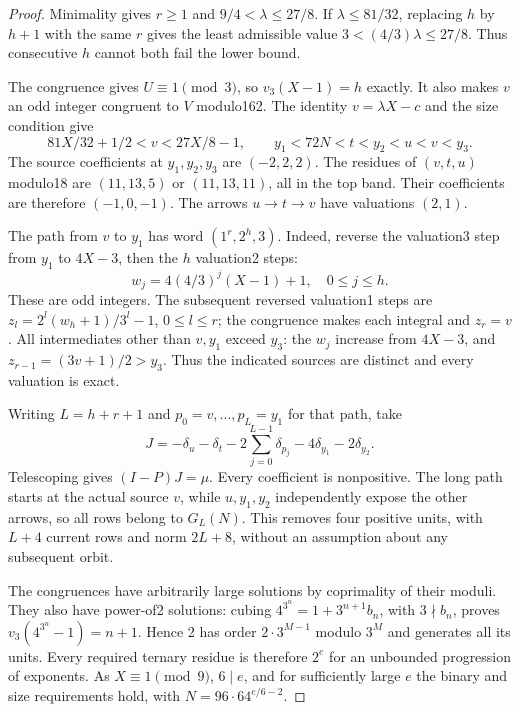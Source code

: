 \documentclass[11pt]{article}
\begin{document}
\begin{proof}
Minimality gives $r\ge1$ and $9/4<\lambda\le27/8$. If
$\lambda\le81/32$, replacing $h$ by $h+1$ with the same $r$ gives the
least admissible value $3<(4/3)\lambda\le27/8$. Thus consecutive $h$
cannot both fail the lower bound.

The congruence gives $U\equiv1\pmod3$, so $v_3(X-1)=h$ exactly.
It also makes $v$ an odd integer congruent to $V$ modulo162.
The identity $v=\lambda X-c$ and the size condition give
\[
 81X/32+1/2<v<27X/8-1,\qquad
 y_1<72N<t<y_2<u<v<y_3.
\]
The source coefficients at $y_1,y_2,y_3$ are $(-2,2,2)$.
The residues of $(v,t,u)$ modulo18 are $(11,13,5)$ or
$(11,13,11)$, all in the top band. Their coefficients are therefore
$(-1,0,-1)$. The arrows $u\to t\to v$ have valuations $(2,1)$.

The path from $v$ to $y_1$ has word $(1^r,2^h,3)$. Indeed, reverse
the valuation3 step from $y_1$ to $4X-3$, then the $h$ valuation2 steps:
\[
 w_j=4(4/3)^j(X-1)+1,\quad 0\le j\le h.
\]
These are odd integers. The subsequent reversed valuation1 steps are
$z_l=2^l(w_h+1)/3^l-1$, $0\le l\le r$; the congruence makes each
integral and $z_r=v$. All intermediates other than $v,y_1$ exceed $y_3$:
the $w_j$ increase from $4X-3$, and
$z_{r-1}=(3v+1)/2>y_3$. Thus the indicated sources are distinct and
every valuation is exact.

Writing $L=h+r+1$ and $p_0=v,\ldots,p_L=y_1$ for that path, take
\[
 J=-\delta_u-\delta_t-2\sum_{j=0}^{L-1}\delta_{p_j}
                         -4\delta_{y_1}-2\delta_{y_2}.
\]
Telescoping gives $(I-P)J=\mu$. Every coefficient is nonpositive.
The long path starts at the actual source $v$, while $u,y_1,y_2$
independently expose the other arrows, so all rows belong to $G_L(N)$.
This removes four positive units, with $L+4$ current rows and norm
$2L+8$, without an assumption about any subsequent orbit.

The congruences have arbitrarily large solutions by coprimality of their
moduli. They also have power-of2 solutions: cubing
$4^{3^n}=1+3^{n+1}b_n$, with $3\nmid b_n$, proves
$v_3(4^{3^n}-1)=n+1$. Hence 2 has order $2\cdot3^{M-1}$ modulo
$3^M$ and generates all its units. Every required ternary residue is
therefore $2^e$ for an unbounded progression of exponents. As
$X\equiv1\pmod9$, $6\mid e$, and for sufficiently large $e$ the binary
and size requirements hold, with $N=96\cdot64^{e/6-2}$.
\end{proof}
\end{document}
